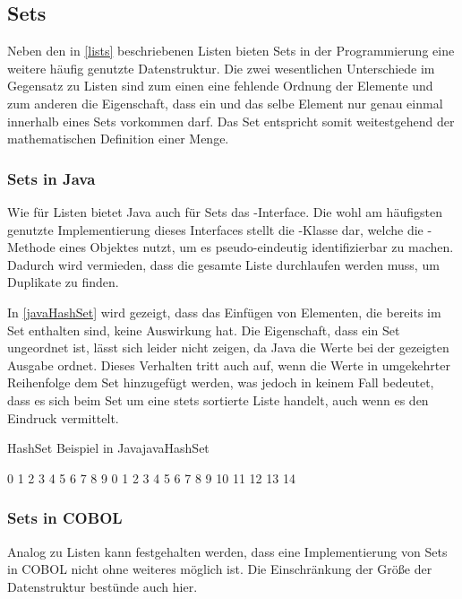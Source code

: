 \subsection{Sets}
Neben den in \autoref{lists} beschriebenen Listen bieten Sets in der Programmierung eine weitere häufig genutzte Datenstruktur. Die zwei wesentlichen Unterschiede im Gegensatz zu Listen sind zum einen eine fehlende Ordnung der Elemente und zum anderen die Eigenschaft, dass ein und das selbe Element nur genau einmal innerhalb eines Sets vorkommen darf. Das Set entspricht somit weitestgehend der mathematischen Definition einer Menge.

\subsubsection*{Sets in Java}
Wie für Listen bietet Java auch für Sets das -Interface. Die wohl am häufigsten genutzte Implementierung dieses Interfaces stellt die -Klasse dar, welche die -Methode eines Objektes nutzt, um es pseudo-eindeutig identifizierbar zu machen. Dadurch wird vermieden, dass die gesamte Liste durchlaufen werden muss, um Duplikate zu finden.

In \autoref{javaHashSet} wird gezeigt, dass das Einfügen von Elementen, die bereits im Set enthalten sind, keine Auswirkung hat. Die Eigenschaft, dass ein Set ungeordnet ist, lässt sich leider nicht zeigen, da Java die Werte bei der gezeigten Ausgabe ordnet. Dieses Verhalten tritt auch auf, wenn die Werte in umgekehrter Reihenfolge dem Set hinzugefügt werden, was jedoch in keinem Fall bedeutet, dass es sich beim Set um eine stets sortierte Liste handelt, auch wenn es den Eindruck vermittelt.

\begin{codeWithCaption}{HashSet Beispiel in Java}{javaHashSet}
\begin{shellwindow}
0 1 2 3 4 5 6 7 8 9 
0 1 2 3 4 5 6 7 8 9 10 11 12 13 14 
\end{shellwindow}
\end{codeWithCaption}

\subsubsection*{Sets in COBOL}
Analog zu Listen kann festgehalten werden, dass eine Implementierung von Sets in COBOL nicht ohne weiteres möglich ist. Die Einschränkung der Größe der Datenstruktur bestünde auch hier. 

